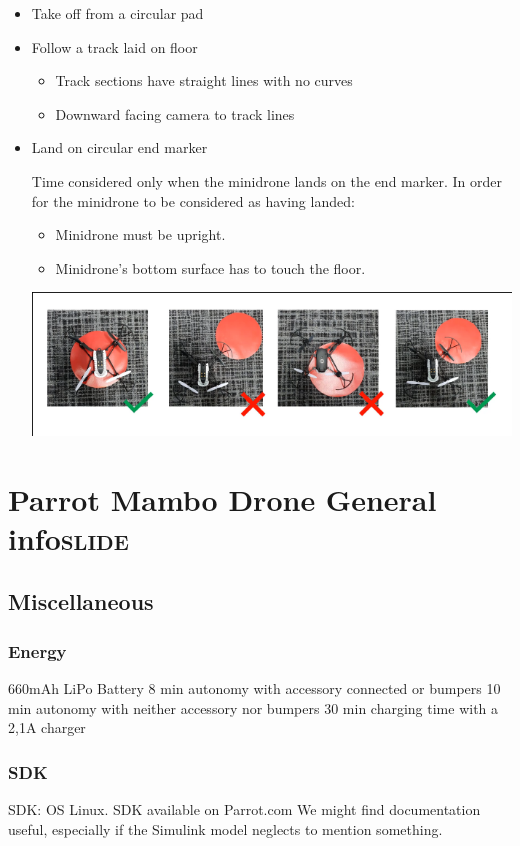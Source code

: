 \documentclass[11pt]{article}
\begin{document}
\begin{itemize}
\item Take off from a circular pad
\item Follow a track laid on floor
\begin{itemize}
\item Track sections have straight lines with no curves
\item Downward facing camera to track lines
\end{itemize}
\item Land on circular end marker

Time considered only when the minidrone lands on the end marker.
In order for the minidrone to be considered as having landed:
\begin{itemize}
\item Minidrone must be upright.
\item Minidrone's bottom surface has to touch the floor.
\end{itemize}
\begin{center}
\includegraphics[width=.9\linewidth]{./images/screenshot-01.png}
\end{center}
\end{itemize}

\section{Parrot Mambo Drone General info\hfill{}\textsc{slide}}
\label{sec:org2dbfb8a}
\subsection{Miscellaneous}
\label{sec:org1f0a261}
\subsubsection{Energy}
\label{sec:orgfacc3f3}
660mAh LiPo Battery
8 min autonomy with accessory connected or bumpers
10 min autonomy with neither accessory nor bumpers
30 min charging time with a 2,1A charger

\subsubsection{SDK}
\label{sec:orga233967}
SDK: OS Linux. SDK available on Parrot.com
We might find documentation useful, especially if the Simulink model neglects to mention something.
\end{document}
